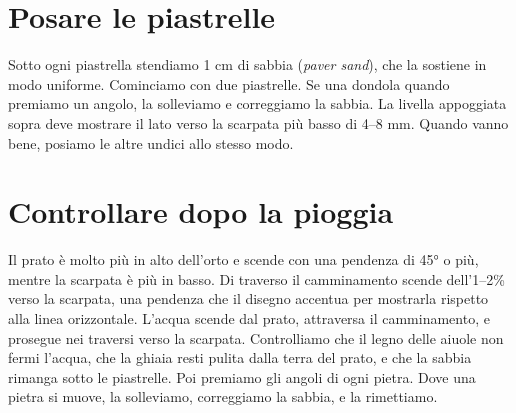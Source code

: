 \documentclass[11pt,a4paper]{article}
\newcommand{\strew}[7]{\foreach \i in {1,...,#5}{\foreach \j in {1,...,#6}{
  \pgfmathsetmacro\px{(#1)+((#3)-(#1))*(\i-.5+.2*rand)/#5}\pgfmathsetmacro\py{(#2)+((#4)-(#2))*(\j-.5+.2*rand)/#6}
  \pgfmathsetmacro\pr{40*rand}\pic[rotate=\pr] at (\px,\py) {#7};}}}
\newcommand{\soil}{\fill[mSoil] (0,-3) rectangle (60,-6.5);\node[wlab] at (30,-5) {Terra compattata};}
\newcommand{\cloth}{\draw[mCloth,line width=1.5pt] (0,-3)--(60,-3);}
\newcommand{\base}{\fill[mBase] (0,-3) rectangle (60,-2);\strew{0.3}{-2.95}{59.7}{-2.05}{54}{2}{chip}}
\newcommand{\sand}{\foreach \x in {10,34}{\fill[mSand] (\x,-2) rectangle +(16,.4);}}
\newcommand{\sectiles}{\foreach \x in {10,34}{\draw[mat=mTile,rounded corners=1pt] (\x,-1.6) rectangle +(16,1.6);}}
\newcommand{\level}[2]{\draw[mat=mLevel,rounded corners=1pt] ([xshift=-.8cm]#1,#2) rectangle +(1.6cm,.3cm);\draw[fill=mLawn!50,draw=mLevel!60!black,rounded corners=1pt] ([xshift=-.3cm,yshift=.08cm]#1,#2) rectangle +(.6cm,.14cm);}
\begin{document}
\section{Posare le piastrelle}
Sotto ogni piastrella stendiamo 1 cm di sabbia (\textit{paver sand}), che la sostiene in modo uniforme. Cominciamo con due piastrelle. Se una dondola quando premiamo un angolo, la solleviamo e correggiamo la sabbia. La livella appoggiata sopra deve mostrare il lato verso la scarpata più basso di 4--8 mm. Quando vanno bene, posiamo le altre undici allo stesso modo.
\par\nopagebreak
\begin{center}\end{center}

\section{Controllare dopo la pioggia}
Il prato è molto più in alto dell'orto e scende con una pendenza di 45° o più, mentre la scarpata è più in basso. Di traverso il camminamento scende dell'1--2\% verso la scarpata, una pendenza che il disegno accentua per mostrarla rispetto alla linea orizzontale. L'acqua scende dal prato, attraversa il camminamento, e prosegue nei traversi verso la scarpata. Controlliamo che il legno delle aiuole non fermi l'acqua, che la ghiaia resti pulita dalla terra del prato, e che la sabbia rimanga sotto le piastrelle. Poi premiamo gli angoli di ogni pietra. Dove una pietra si muove, la solleviamo, correggiamo la sabbia, e la rimettiamo.
\end{document}
